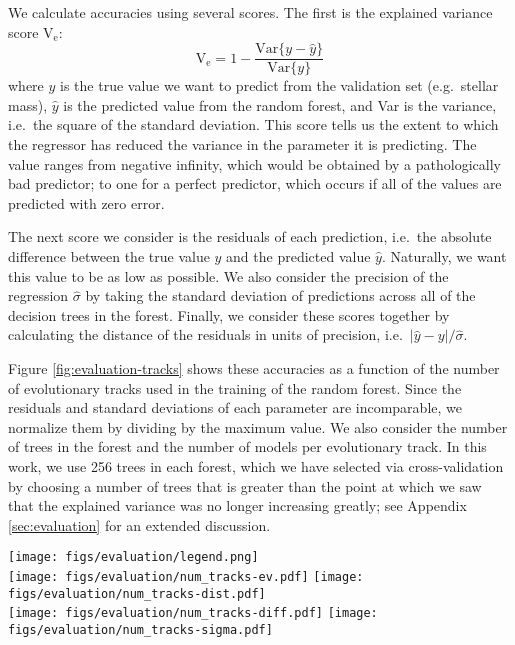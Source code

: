 \documentclass[twocolumn,twocolappendix]{aastex6}
\newcommand\abs[1]{\left|#1\right|}
\newif\ifref
\newcommand{\mb}[1]{\ifref\boldmath\textbf{#1}\unboldmath\else #1\fi}
\begin{document}
We calculate accuracies using several scores. The first is the explained variance score V$_{\text{e}}$:
\begin{equation}
  \text{V}_{\text{e}} = 1 - \frac{\text{Var}\{ y - \hat y \}}{\text{Var}\{ y \}}
\end{equation}
where $y$ is the \mb{true} value we want to predict from the validation set (e.g.\ stellar mass), $\hat y$ is the predicted value from the random forest, and Var is the variance, i.e.\ the square of the standard deviation. This score tells us the extent to which the regressor has reduced the variance in the parameter it is predicting. The value ranges from negative infinity, which would be obtained by a pathologically bad predictor; to one for a perfect predictor, which occurs if all of the values are predicted with zero error. 

The next score we consider is the residuals of each prediction, i.e.\ the absolute difference between the true value $y$ and the predicted value $\hat y$. Naturally, we want this value to be as low as possible. We also consider the precision of the regression $\hat \sigma$ by taking the standard deviation of predictions across all of the decision trees in the forest. Finally, we consider these scores together by calculating the distance of the residuals in units of precision, i.e.\ $\abs{\hat y - y} / \hat{\sigma}$. 

Figure \ref{fig:evaluation-tracks} shows these accuracies as a function of the number of evolutionary tracks used in the training of the random forest. Since the residuals and standard deviations of each parameter are incomparable, we normalize them by dividing by the maximum value. We also consider the number of trees in the forest and the number of models per evolutionary track\mb{. In this work, we use 256 trees in each forest, which we have selected via cross-validation by choosing a number of trees that is greater than the point at which we saw that the explained variance was no longer increasing greatly;} see Appendix \ref{sec:evaluation} for an extended discussion. 

\begin{figure*}
    \centering
    \texttt{[image: figs/evaluation/legend.png]}\\
    \texttt{[image: figs/evaluation/num\_tracks-ev.pdf]}\hfill
    \texttt{[image: figs/evaluation/num\_tracks-dist.pdf]}\\
    \texttt{[image: figs/evaluation/num\_tracks-diff.pdf]}\hfill
    \texttt{[image: figs/evaluation/num\_tracks-sigma.pdf]}\\
    \caption{Evaluations of regression accuracy. Explained variance (top left), accuracy per precision distance (top right), normalized absolute error (bottom left), and normalized uncertainty (bottom right) for each stellar parameter as a function of the number of evolutionary tracks used in training the random forest. These results use 64 models per track and 256 trees in the random forest. } 
    \label{fig:evaluation-tracks}
\end{figure*}
\end{document}
